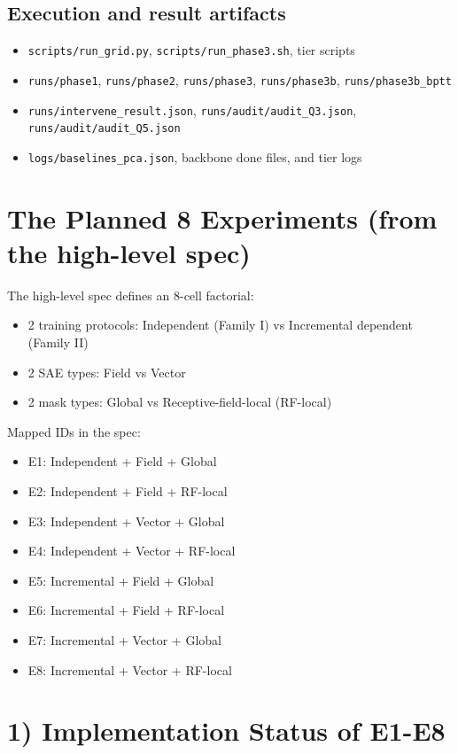 \documentclass[11pt]{article}
\begin{document}
\subsection{Execution and result artifacts}
\begin{itemize}[leftmargin=*]
    \item \texttt{scripts/run\_grid.py}, \texttt{scripts/run\_phase3.sh}, tier scripts
    \item \texttt{runs/phase1}, \texttt{runs/phase2}, \texttt{runs/phase3}, \texttt{runs/phase3b}, \texttt{runs/phase3b\_bptt}
    \item \texttt{runs/intervene\_result.json}, \texttt{runs/audit/audit\_Q3.json}, \texttt{runs/audit/audit\_Q5.json}
    \item \texttt{logs/baselines\_pca.json}, backbone done files, and tier logs
\end{itemize}

\section{The Planned 8 Experiments (from the high-level spec)}
The high-level spec defines an 8-cell factorial:
\begin{itemize}[leftmargin=*]
    \item 2 training protocols: Independent (Family I) vs Incremental dependent (Family II)
    \item 2 SAE types: Field vs Vector
    \item 2 mask types: Global vs Receptive-field-local (RF-local)
\end{itemize}

Mapped IDs in the spec:
\begin{itemize}[leftmargin=*]
    \item E1: Independent + Field + Global
    \item E2: Independent + Field + RF-local
    \item E3: Independent + Vector + Global
    \item E4: Independent + Vector + RF-local
    \item E5: Incremental + Field + Global
    \item E6: Incremental + Field + RF-local
    \item E7: Incremental + Vector + Global
    \item E8: Incremental + Vector + RF-local
\end{itemize}

\section{1) Implementation Status of E1-E8}
\end{document}
